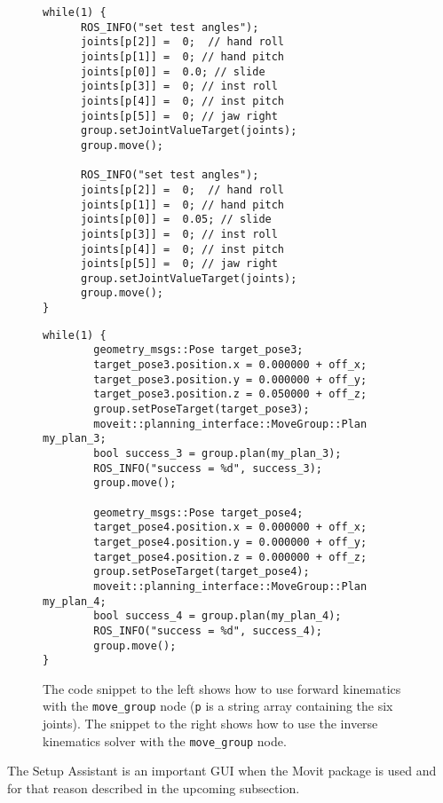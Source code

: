\begin{figure}[H]
    \centering
    \begin{minipage}{.5\textwidth}
\begin{lstlisting}[language=gedit]
while(1) {
      ROS_INFO("set test angles");
      joints[p[2]] =  0;  // hand roll
      joints[p[1]] =  0; // hand pitch
      joints[p[0]] =  0.0; // slide
      joints[p[3]] =  0; // inst roll
      joints[p[4]] =  0; // inst pitch
      joints[p[5]] =  0; // jaw right
      group.setJointValueTarget(joints);
      group.move();

      ROS_INFO("set test angles");
      joints[p[2]] =  0;  // hand roll
      joints[p[1]] =  0; // hand pitch
      joints[p[0]] =  0.05; // slide
      joints[p[3]] =  0; // inst roll
      joints[p[4]] =  0; // inst pitch
      joints[p[5]] =  0; // jaw right
      group.setJointValueTarget(joints);
      group.move();
}
\end{lstlisting}
    \end{minipage}%
    \begin{minipage}{0.5\textwidth}
\begin{lstlisting}[language=gedit]
while(1) {
        geometry_msgs::Pose target_pose3;
        target_pose3.position.x = 0.000000 + off_x;
        target_pose3.position.y = 0.000000 + off_y;
        target_pose3.position.z = 0.050000 + off_z;
        group.setPoseTarget(target_pose3);
        moveit::planning_interface::MoveGroup::Plan my_plan_3;
        bool success_3 = group.plan(my_plan_3);
        ROS_INFO("success = %d", success_3);
        group.move();

        geometry_msgs::Pose target_pose4;
        target_pose4.position.x = 0.000000 + off_x;
        target_pose4.position.y = 0.000000 + off_y;
        target_pose4.position.z = 0.000000 + off_z;
        group.setPoseTarget(target_pose4);
        moveit::planning_interface::MoveGroup::Plan my_plan_4;
        bool success_4 = group.plan(my_plan_4);
        ROS_INFO("success = %d", success_4);
        group.move();
}
\end{lstlisting}
    \end{minipage}
    \caption{The code snippet to the left shows how to use forward kinematics with the \texttt{move\_group} node (\texttt{p} is a string array containing the six joints). The snippet to the right shows how to use the inverse kinematics solver with the \texttt{move\_group} node.}\label{fig:code-eks-moveit}
\end{figure}
The Setup Assistant is an important GUI when the Movit package is used and for that reason described in the upcoming subsection.
